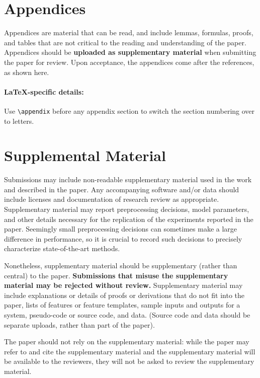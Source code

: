 \documentclass[11pt,a4paper]{article}
\begin{document}
\section{Appendices}
\label{sec:appendix}
Appendices are material that can be read, and include lemmas, formulas, proofs, and tables that are not critical to the reading and understanding of the paper. 
Appendices should be \textbf{uploaded as supplementary material} when submitting the paper for review.
Upon acceptance, the appendices come after the references, as shown here.

\paragraph{\LaTeX-specific details:}
Use {\small\verb|\appendix|} before any appendix section to switch the section numbering over to letters.


\section{Supplemental Material}
\label{sec:supplemental}
Submissions may include non-readable supplementary material used in the work and described in the paper.
Any accompanying software and/or data should include licenses and documentation of research review as appropriate.
Supplementary material may report preprocessing decisions, model parameters, and other details necessary for the replication of the experiments reported in the paper.
Seemingly small preprocessing decisions can sometimes make a large difference in performance, so it is crucial to record such decisions to precisely characterize state-of-the-art methods. 

Nonetheless, supplementary material should be supplementary (rather than central) to the paper.
\textbf{Submissions that misuse the supplementary material may be rejected without review.}
Supplementary material may include explanations or details of proofs or derivations that do not fit into the paper, lists of
features or feature templates, sample inputs and outputs for a system, pseudo-code or source code, and data.
(Source code and data should be separate uploads, rather than part of the paper).

The paper should not rely on the supplementary material: while the paper may refer to and cite the supplementary material and the supplementary material will be available to the reviewers, they will not be asked to review the supplementary material.
\end{document}
